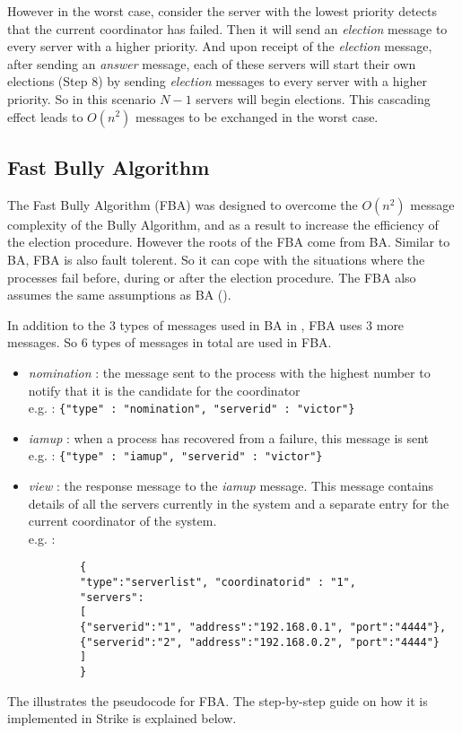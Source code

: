 \documentclass[dareport.tex]{subfiles}
\begin{document}
However in the worst case, consider the server with the lowest priority detects that the current coordinator has failed. Then it will send an \emph{election} message to every server with a higher priority. And upon receipt of the \emph{election} message, after sending an \emph{answer} message, each of these servers will start their own elections (Step 8) by sending \emph{election} messages to every server with a higher priority. So in this scenario $ N-1 $ servers will begin elections. This cascading effect leads to $ O(n^2) $ messages to be exchanged in the worst case.

\subsection{Fast Bully Algorithm} \label{ssec:fast-bully}
The Fast Bully Algorithm (FBA)\cite{fastbully} was designed to overcome the $ O(n^2) $ message complexity of the Bully Algorithm, and as a result to increase the efficiency of the election procedure. However the roots of the FBA come from BA. Similar to BA, FBA is also fault tolerent. So it can cope with the situations where the processes fail before, during or after the election procedure. The FBA also assumes the same assumptions as BA ().

In addition to the 3 types of messages used in BA in , FBA uses 3 more messages. So 6 types of messages in total are used in FBA.
\begin{itemize}\label{fba-message-types}
	\item \emph{nomination} : the message sent to the process with the highest number to notify that it is the candidate for the coordinator\\
	e.g. : \verb|{"type" : "nomination", "serverid" : "victor"}|
	\item \emph{iamup} : when a process has recovered from a failure, this message is sent\\
	e.g. : \verb|{"type" : "iamup", "serverid" : "victor"}|
	\item \emph{view} : the response message to the \emph{iamup} message. This message contains details of all the servers currently in the system and a separate entry for the current coordinator of the system.\\
	e.g. :
	\begin{small}
		\begin{verbatim}
		{
		"type":"serverlist", "coordinatorid" : "1",
		"servers": 
		[ 	
		{"serverid":"1", "address":"192.168.0.1", "port":"4444"}, 
		{"serverid":"2", "address":"192.168.0.2", "port":"4444"} 
		]
		}
		\end{verbatim}
	\end{small}
\end{itemize}
The  illustrates the pseudocode for FBA. The step-by-step guide on how it is implemented in Strike is explained below.
\end{document}
